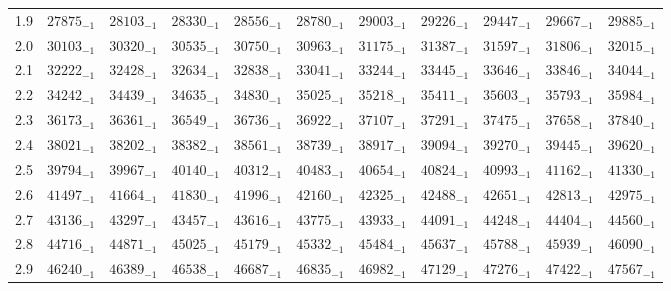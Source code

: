 \documentclass[10pt, a4paper]{article}
\begin{document}
\begin{center}
\begin{longtable}{c || c c c c c | c c c c c}
        1.9 & \({27875}_{-1}\) & \({28103}_{-1}\) & \({28330}_{-1}\) & \({28556}_{-1}\) & \({28780}_{-1}\) & \({29003}_{-1}\) & \({29226}_{-1}\) & \({29447}_{-1}\) & \({29667}_{-1}\) & \({29885}_{-1}\)\\
        2.0 & \({30103}_{-1}\) & \({30320}_{-1}\) & \({30535}_{-1}\) & \({30750}_{-1}\) & \({30963}_{-1}\) & \({31175}_{-1}\) & \({31387}_{-1}\) & \({31597}_{-1}\) & \({31806}_{-1}\) & \({32015}_{-1}\)\\
        2.1 & \({32222}_{-1}\) & \({32428}_{-1}\) & \({32634}_{-1}\) & \({32838}_{-1}\) & \({33041}_{-1}\) & \({33244}_{-1}\) & \({33445}_{-1}\) & \({33646}_{-1}\) & \({33846}_{-1}\) & \({34044}_{-1}\)\\
        2.2 & \({34242}_{-1}\) & \({34439}_{-1}\) & \({34635}_{-1}\) & \({34830}_{-1}\) & \({35025}_{-1}\) & \({35218}_{-1}\) & \({35411}_{-1}\) & \({35603}_{-1}\) & \({35793}_{-1}\) & \({35984}_{-1}\)\\
        2.3 & \({36173}_{-1}\) & \({36361}_{-1}\) & \({36549}_{-1}\) & \({36736}_{-1}\) & \({36922}_{-1}\) & \({37107}_{-1}\) & \({37291}_{-1}\) & \({37475}_{-1}\) & \({37658}_{-1}\) & \({37840}_{-1}\)\\
        2.4 & \({38021}_{-1}\) & \({38202}_{-1}\) & \({38382}_{-1}\) & \({38561}_{-1}\) & \({38739}_{-1}\) & \({38917}_{-1}\) & \({39094}_{-1}\) & \({39270}_{-1}\) & \({39445}_{-1}\) & \({39620}_{-1}\)\\
        2.5 & \({39794}_{-1}\) & \({39967}_{-1}\) & \({40140}_{-1}\) & \({40312}_{-1}\) & \({40483}_{-1}\) & \({40654}_{-1}\) & \({40824}_{-1}\) & \({40993}_{-1}\) & \({41162}_{-1}\) & \({41330}_{-1}\)\\
        2.6 & \({41497}_{-1}\) & \({41664}_{-1}\) & \({41830}_{-1}\) & \({41996}_{-1}\) & \({42160}_{-1}\) & \({42325}_{-1}\) & \({42488}_{-1}\) & \({42651}_{-1}\) & \({42813}_{-1}\) & \({42975}_{-1}\)\\
        2.7 & \({43136}_{-1}\) & \({43297}_{-1}\) & \({43457}_{-1}\) & \({43616}_{-1}\) & \({43775}_{-1}\) & \({43933}_{-1}\) & \({44091}_{-1}\) & \({44248}_{-1}\) & \({44404}_{-1}\) & \({44560}_{-1}\)\\
        2.8 & \({44716}_{-1}\) & \({44871}_{-1}\) & \({45025}_{-1}\) & \({45179}_{-1}\) & \({45332}_{-1}\) & \({45484}_{-1}\) & \({45637}_{-1}\) & \({45788}_{-1}\) & \({45939}_{-1}\) & \({46090}_{-1}\)\\
        2.9 & \({46240}_{-1}\) & \({46389}_{-1}\) & \({46538}_{-1}\) & \({46687}_{-1}\) & \({46835}_{-1}\) & \({46982}_{-1}\) & \({47129}_{-1}\) & \({47276}_{-1}\) & \({47422}_{-1}\) & \({47567}_{-1}\)\\

\end{longtable}
\end{center}
\end{document}
